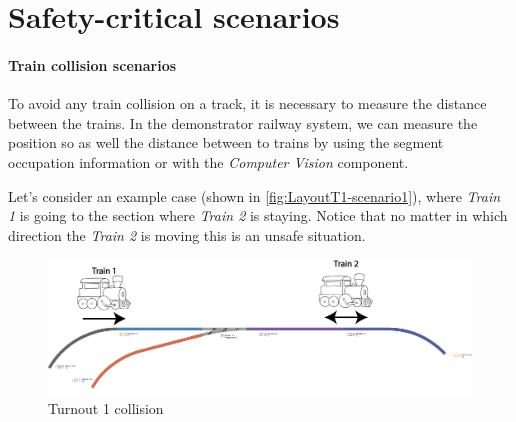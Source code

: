\section{Safety-critical scenarios}
\paragraph{Train collision scenarios} 
To avoid any train collision on a track, it is necessary to measure the distance between the trains. In the demonstrator railway system, we can measure the position so as well the distance between to trains by using the segment occupation information or with the \textit{Computer Vision} component. 

Let's consider an example case (shown in \autoref{fig:LayoutT1-scenario1}), where \textit{Train 1} is going to the section where \textit{Train 2} is staying. Notice that no matter in which direction the \textit{Train 2} is moving this is an unsafe situation.
\begin{figure}[!h]
	\centering
	\includegraphics[width=150mm, keepaspectratio]{figures/modes3/layoutT1-scenario2.png}
	\caption{Turnout 1 collision }
	\label{fig:LayoutT1-scenario1}
\end{figure}


